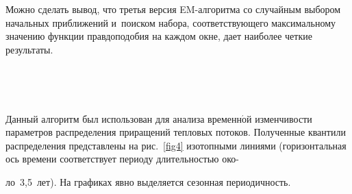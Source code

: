 \begin{multicols}{2}
Можно сделать вывод, что третья версия EM-ал\-го\-рит\-ма со случайным
выбором начальных приближений и~поиском набора,
соответствующего максимальному значению функции правдоподобия
на каждом окне, дает наиболее четкие результаты.

\begin{figure*} %
\vspace*{1pt}
 \begin{center}
 \mbox{%
 \epsfxsize=106.544mm
 }
 \end{center}
 \vspace*{-12pt}
\vspace*{-3pt}
\end{figure*}
\begin{figure*}[b] %
\vspace*{-3pt}
 \begin{center}
 \mbox{%
 \epsfxsize=166mm %
 }
 \end{center}
 \vspace*{-12pt}
\end{figure*}


Данный алгоритм был использован для анализа временн$\acute{\mbox{о}}$й
изменчивости параметров распределения приращений тепловых
потоков. Полученные квантили распределения представлены на
рис.~\ref{fig4} изотопными линиями (горизонтальная ось времени
соответствует периоду длительностью око-\linebreak\vspace*{-12pt}

\pagebreak

\noindent
ло~3,5~лет). На графиках
явно выделяется сезонная периодичность.

\begin{figure*} %
\vspace*{1pt}
 \begin{center}
 \mbox{%
 \epsfxsize=144.858mm
 }
 \end{center}
 \vspace*{-11pt}
\end{figure*}


\end{multicols}
